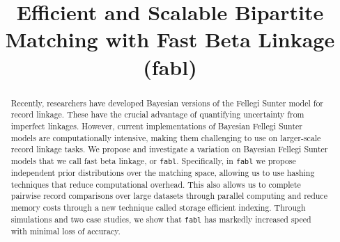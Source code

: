 \documentclass[ba]{imsart}
\begin{document}

\begin{frontmatter}
\title{Efficient and Scalable Bipartite Matching with Fast Beta Linkage  (fabl)}



\begin{abstract}
Recently, researchers have developed Bayesian versions of the Fellegi Sunter model for record linkage. These have the crucial advantage of quantifying uncertainty from imperfect linkages.  However, current implementations of Bayesian Fellegi Sunter models are computationally intensive, making them challenging to use on larger-scale record linkage tasks.  We propose and investigate a variation on Bayesian Fellegi Sunter models that we call fast beta linkage, or \texttt{fabl}.  Specifically, in \texttt{fabl} we propose independent prior distributions over the matching space, allowing us to use hashing techniques that reduce computational overhead. This also allows us to complete pairwise record comparisons over large datasets through parallel computing and reduce memory costs through a new technique called storage efficient indexing. Through simulations and two case studies, we show that \texttt{fabl} has markedly increased speed with minimal loss of accuracy.
\end{abstract}

\begin{keyword}%
\end{keyword}

\end{frontmatter}
\end{document}
